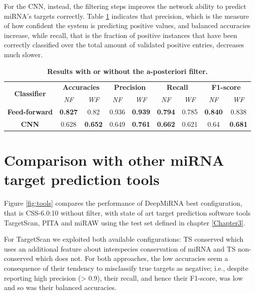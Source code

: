 For the CNN, instead, the filtering steps improves the network ability to predict miRNA's targets correctly. Table \ref{tab:sa_filter} indicates that precision, which is the measure of how confident the system is predicting positive values, and balanced accuracies increase, while recall, that is the fraction of positive instances that have been correctly classified over the total amount of validated positive entries, decreases much slower. 

\begin{table}[h!]
	\caption{\textbf{Results with or without the a-posteriori filter.}}
	\label{tab:sa_filter}
	\centering
	\begin{tabular}{| c | c | c | c | c | c | c | c | c |}
		\hline
		\multirow{2}{4.5em}{\textbf{Classifier}} & \multicolumn{2}{c|}{\textbf{Accuracies}} & \multicolumn{2}{c|}{\textbf{Precision}} & \multicolumn{2}{c|}{\textbf{Recall}} & \multicolumn{2}{c|}{\textbf{F1-score}} \\ 
		\cline{2-9}
		& \emph{NF} & \emph{WF} & \emph{NF} & \emph{WF} & \emph{NF} & \emph{WF} & \emph{NF} & \emph{WF} \\ 
		\hline
		\textbf{Feed-forward} & \textbf{0.827} & 0.82 & 0.936 & \textbf{0.939} & \textbf{0.794} & 0.785 & \textbf{0.840} & 0.838 \\ 
		\hline
		\textbf{CNN} & 0.628 & \textbf{0.652} & 0.649 & \textbf{0.761} & \textbf{0.662} & 0.621 & 0.64 & \textbf{0.681} \\ 
		\hline 
	\end{tabular}
\end{table}

\section{Comparison with other miRNA target prediction tools}

Figure \ref{fig:tools} compares the performance of DeepMiRNA best configuration, that is CSS-6.0:10 without filter, with state of art target prediction software tools TargetScan, PITA and miRAW using the test set defined in chapter \ref{Chapter3}.

For TargetScan we exploited both available configurations: TS conserved which uses an additional feature about interspecies conservation of miRNA and TS non-conserved which does not. For both approaches, the low accuracies seem a consequence of their tendency to misclassify true targets as negative; i.e., despite reporting high precision (> 0.9),
their recall, and hence their F1-score, was low and so was their balanced accuracies.


